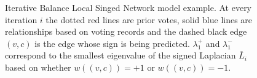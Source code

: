 \begin{figure}[!ht]
  


    \caption{Iterative Balance Local Singed Network model example. At every iteration $i$ the dotted red lines are prior votes, solid blue lines are relationships based on voting records and the dashed black edge $(v,c)$ is the edge whose sign is being predicted. $\lambda_1^+$ and $\lambda_1^-$ correspond to the smallest eigenvalue of the signed Laplacian $\overline{L}_i$ based on whether $w((v,c))=+1$ or $w((v,c))=-1$.     }
    \label{}
\end{figure}